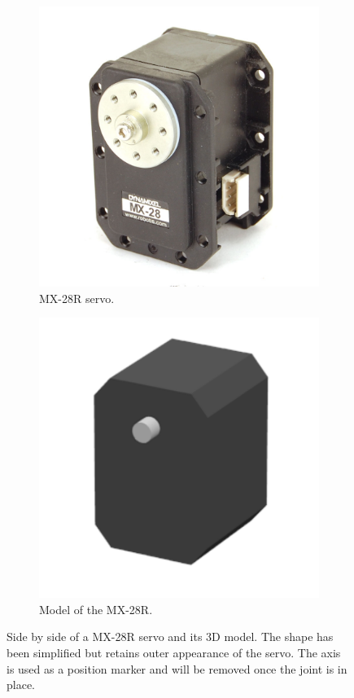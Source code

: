 \begin{figure}[htp]
\centering
\begin{subfigure}[b]{0.3\textwidth}
    \includegraphics[width = \textwidth]{figures/mx28}
    \caption{MX-28R servo.}
    \label{fig:mx28_real}
\end{subfigure}
\hfill
\begin{subfigure}[b]{0.3\textwidth}
    \includegraphics[width = \textwidth]{figures/mx28_model}
    \caption{Model of the MX-28R.}
    \label{fig:mx28_model}
\end{subfigure}
\caption[Side by side of a MX-28R servo and its 3D model]{Side by side of a MX-28R servo and its 3D model. The shape has been simplified but retains outer appearance of the servo. The axis is used as a position marker and will be removed once the joint is in place.}
\label{fig:servo}
\end{figure}

